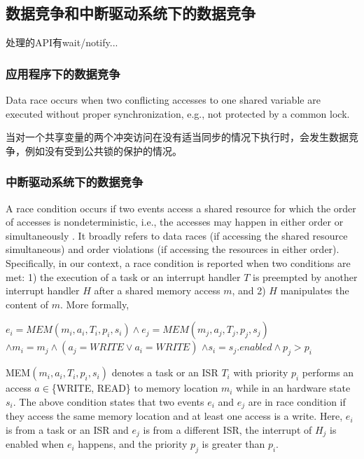 \subsection{数据竞争和中断驱动系统下的数据竞争}\label{sec:related:idrace}
处理的API有wait/notify...
\subsubsection{应用程序下的数据竞争}
Data race occurs when two conflicting accesses to one shared variable are executed without proper synchronization, e.g., not protected by a common lock.

当对一个共享变量的两个冲突访问在没有适当同步的情况下执行时，会发生数据竞争，例如没有受到公共锁的保护的情况。

\subsubsection{中断驱动系统下的数据竞争}


A race condition occurs if two events access a shared resource for which the order of accesses is nondeterministic, i.e., the accesses may happen in either order or simultaneously \cite{vonPraun2011, netzer1992what}. 
It broadly refers to data races (if accessing the shared resource simultaneous) and order violations (if accessing the resources in either order).  
Specifically, in our context, a race condition is reported when two conditions are met: 
1) the execution of
a task or an interrupt handler $T$
is preempted by another interrupt handler $H$ after
a shared memory access $m$, and 2)  $H$
manipulates the content of $m$.
More formally,


\begin{center}
$\mathit{
e_i = MEM (m_i, a_i, T_i, p_i, s_i) \wedge e_j = MEM (m_j,
a_j, T_j, p_j, s_j)}$
$\mathit{\wedge m_i = m_j \wedge  (a_j =
WRITE \vee a_i = WRITE)}$
$\mathit{  \wedge s_i = s_j.enabled \wedge p_j > p_i
}$
\end{center}

\noindent
MEM$(m_i, a_i, T_i, p_i, s_i)$ denotes a 
task or an ISR $T_i$ with priority $p_i$ performs
an access $a \in $\{WRITE, READ\} to memory location $m_i$ while
in an hardware state $s_i$. 
The above condition states that two events $e_i$ and $e_j$ are in race condition
if they access the same memory location and at least one access is a write.
Here,
$e_i$ is from a task or an ISR and $e_j$ is from a different ISR,
the interrupt of $H_j$ is enabled when $e_i$
happens, and the priority $p_j$ is greater than $p_i$.

